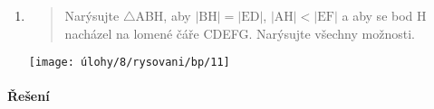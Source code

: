 \begin{enumerate}
    \item
    \begin{minipage}[t]{\linewidth}
        \begin{quote}
            Narýsujte $\triangle$ABH, aby $\lvert \text{BH} \rvert = \lvert \text{ED} \rvert$, $\lvert \text{AH} \rvert < \lvert \text{EF} \rvert$ a aby se bod H nacházel na lomené čáře CDEFG\@. Narýsujte všechny možnosti.
        \end{quote}
        \centering
        \texttt{[image: úlohy/8/rysovani/bp/11]}

    \end{minipage}
\end{enumerate}


\newpage

\paragraph{Řešení}
